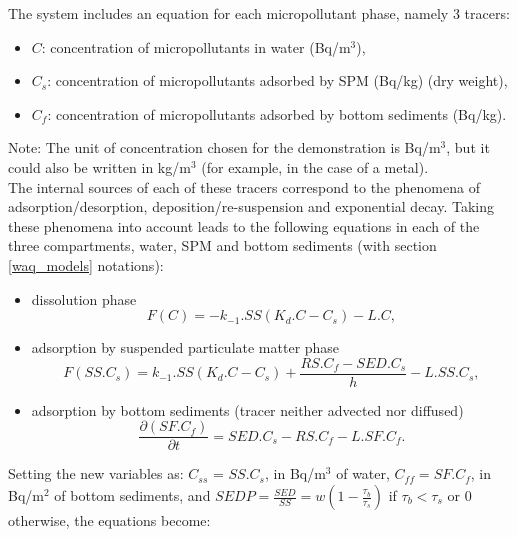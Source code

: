 The system includes an equation for each micropollutant phase, namely 3 tracers:

\begin{itemize}
\item $C$: concentration of micropollutants in water (Bq/m$^3$),
\item $C_s$: concentration of micropollutants adsorbed by SPM (Bq/kg) (dry weight),
\item $C_f$: concentration of micropollutants adsorbed by bottom sediments (Bq/kg).
\end{itemize}

Note: The unit of concentration chosen for the demonstration is Bq/m$^3$,
but it could also be written in kg/m$^3$ (for example, in the case of a metal).\\

The internal sources of each of these tracers correspond to the phenomena
of adsorption/desorption, deposition/re-suspension and exponential decay.
Taking these phenomena into account leads to the following equations
in each of the three compartments, water, SPM and bottom sediments
(with section \ref{waq_models} notations):

\begin{itemize}
\item dissolution phase
\begin{equation}
  F(C) = -k_{-1}.SS (K_d.C - C_s ) - L.C,
\end{equation}

\item adsorption by suspended particulate matter phase
\begin{equation}
  F(SS.C_s) = k_{-1}.SS (K_d.C - C_s ) + \frac{RS.C_f-SED.C_s}{h} - L.SS.C_s,
\end{equation}

\item adsorption by bottom sediments (tracer neither advected nor diffused)
\begin{equation}
  \frac{\partial (SF.C_f)}{\partial t} = SED.C_s - RS.C_f - L.SF.C_f.
\end{equation}

\end{itemize}

Setting the new variables as: $C_{ss}$  = $SS.C_s$, in Bq/m$^3$ of water,
$C_{ff} = SF.C_f$, in Bq/m$^2$ of bottom sediments,
and $SEDP = \frac{SED}{SS} = w \left (1-\frac{\tau_b}{\tau_s} \right)$
if $\tau_b < \tau_s$ or 0 otherwise, the equations become:\\

